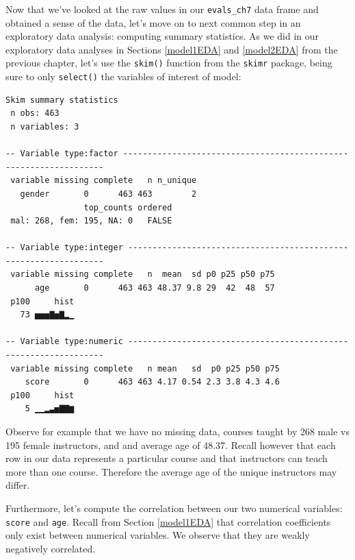 \documentclass[12pt, krantz2,]{krantz}
\makeatletter
\newenvironment{Shaded}{\begin{snugshade}}{\end{snugshade}}
\newcommand{\KeywordTok}[1]{\textcolor[rgb]{0.27,0.27,0.27}{\textbf{#1}}}
\newcommand{\NormalTok}[1]{#1}
\newcommand{\OperatorTok}[1]{\textcolor[rgb]{0.43,0.43,0.43}{\textbf{#1}}}
\newcommand{\StringTok}[1]{\textcolor[rgb]{0.5,0.5,0.5}{#1}}
\newenvironment{kframe}{%
\medskip{}
\setlength{\fboxsep}{.8em}
 \def\at@end@of@kframe{}%
 \ifinner\ifhmode%
  \def\at@end@of@kframe{\end{minipage}}%
  \begin{minipage}{\columnwidth}%
 \fi\fi%
 \def\FrameCommand##1{\hskip\@totalleftmargin \hskip-\fboxsep
 \colorbox{shadecolor}{##1}\hskip-\fboxsep
     \hskip-\linewidth \hskip-\@totalleftmargin \hskip\columnwidth}%
 \MakeFramed {\advance\hsize-\width
   \@totalleftmargin\z@ \linewidth\hsize
   \@setminipage}}%
 {\par\unskip\endMakeFramed%
 \at@end@of@kframe}
\renewenvironment{Shaded}{\begin{kframe}}{\end{kframe}}
\makeatother
\begin{document}
Now that we've looked at the raw values in our \texttt{evals\_ch7} data frame and obtained a sense of the data, let's move on to next common step in an exploratory data analysis: computing summary statistics. As we did in our exploratory data analyses in Sections \ref{model1EDA} and \ref{model2EDA} from the previous chapter, let's use the \texttt{skim()} function from the \texttt{skimr} package, being sure to only \texttt{select()} the variables of interest of model:

\begin{Shaded}
\end{Shaded}

\begin{verbatim}
Skim summary statistics
 n obs: 463 
 n variables: 3 

-- Variable type:factor ------------------------------------------------------------------
 variable missing complete   n n_unique
   gender       0      463 463        2
                top_counts ordered
 mal: 268, fem: 195, NA: 0   FALSE

-- Variable type:integer -----------------------------------------------------------------
 variable missing complete   n  mean  sd p0 p25 p50 p75
      age       0      463 463 48.37 9.8 29  42  48  57
 p100     hist
   73 ▅▅▅▇▅▇▂▁

-- Variable type:numeric -----------------------------------------------------------------
 variable missing complete   n mean   sd  p0 p25 p50 p75
    score       0      463 463 4.17 0.54 2.3 3.8 4.3 4.6
 p100     hist
    5 ▁▁▂▃▅▇▇▆
\end{verbatim}

Observe for example that we have no missing data, courses taught by 268 male vs 195 female instructors, and and average age of 48.37. Recall however that each row in our data represents a particular course and that instructors can teach more than one course. Therefore the average age of the unique instructors may differ.

Furthermore, let's compute the correlation between our two numerical variables: \texttt{score} and \texttt{age}. Recall from Section \ref{model1EDA} that correlation coefficients only exist between numerical variables. We observe that they are weakly negatively correlated.
\end{document}
